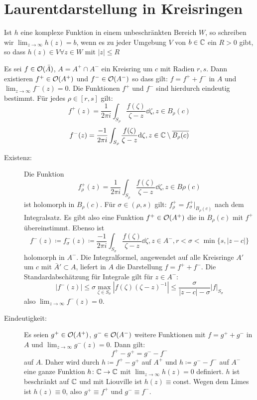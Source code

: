 \section{Laurentdarstellung in Kreisringen}
\begin{definition}
	Ist $ h $ eine komplexe Funktion in einem unbeschr\"ankten Bereich $ W $, so schreiben wir $ \lim_{z\to\infty}h(z)=b $, wenn es zu jeder Umgebung $ V $ von $ b\in\mathbb{C} $ ein $ R>0 $ gibt, so dass $ h(z)\in V\forall z\in W $ mit $ |z|\leq R $
\end{definition}
\begin{satz}
	Es sei $ f\in\mathcal O(\bar A) $, $ A=A^+\cap A^- $ ein Kreisring um $ c $ mit Radien $ r,s $. Dann existieren $ f^+\in\mathcal O(A^+) $ und $ f^-\in\mathcal O(A^-) $ so dass gilt: $ f=f^++f^- $ in $ A $ und $ \lim_{z\to\infty} f^-(z)=0 $. Die Funktionen $ f^+ $ und $ f^- $ sind hierdurch eindeutig bestimmt. F\"ur jedes $ \rho\in[r,s] $ gilt:
	\[ f^+(z)=\frac{1}{2\pi i}\int_{S_\rho}\frac{f(\zeta)}{\zeta-z}\dd\zeta,z\in B_\rho(c) \]
	\[ f^-(z)=\frac{-1}{2\pi i}\int_{S_\rho}\frac{f(\zeta)}{\zeta-z}\mathrm d\zeta,z\in\mathbb{C}\setminus\overline{B_\rho(c)} \]
\end{satz}
\begin{beweis}
	\begin{description}
		\item[Existenz:] Die Funktion \[ f^+_\rho(z)=\frac{1}{2\pi i}\int_{S_{\rho}}\frac{f(\zeta)}{\zeta-z}\dd\zeta, z\in B\rho(c) \] ist holomorph in $ B_\rho(c) $. F\"ur $ \sigma\in(\rho, s) $ gilt: $ f^+_{\rho}=f^+_\sigma|_{B_\rho(c)} $ nach dem Integralsatz. Es gibt also eine Funktion $ f^+\in\mathcal O(A^+) $ die in $ B_\rho(c) $	mit $ f^+ $ \"ubereinstimmt. Ebenso ist
		\[ f^-(z)\coloneqq f^-_\sigma(z)\coloneqq\frac{-1}{2\pi i}\int_{S_\sigma}\frac{f(\zeta)}{\zeta-z}\dd\zeta,z\in A^-, r<\sigma<\min\lbrace s,|z-c|\rbrace \]
		holomorph in $ A^- $. Die Integralformel, angewendet auf alle Kreisringe $ A' $ um $ c $ mit $ \bar A'\subset A $, liefert in $ A $ die Darstellung $ f=f^++f^- $. Die Standardabsch\"atzung f\"ur Integrale gilt f\"ur $ z\in A^- $:
		\[ |f^-(z)|\leq\sigma\max_{\zeta\in S_\sigma}|f(\zeta)(\zeta-z)^{-1}|\leq\frac{\sigma}{|z-c|-\sigma}|f|_{S_\sigma} \]
		also $ \lim_{z\to\infty}f^-(z)=0 $.
		\item[Eindeutigkeit:] Es seien $ g^+\in\mathcal O(A^+) $, $ g^-\in\mathcal O(A^-) $ weitere Funktionen mit $ f=g^++g^- $ in $ A $ und $ \lim_{z\to\infty} g^-(z)=0 $. Dann gilt:
		\[ f^+-g^+=g^--f^- \]
		auf $ A $. Daher wird durch $ h\coloneqq f^+-g^+ $ auf $ A^+ $ und $ h\coloneqq g^--f^- $ auf $ A^- $ eine ganze Funktion $ h\colon\mathbb{C}\rightarrow\mathbb{C} $ mit $ \lim_{z\to\infty}h(z)=0 $ definiert. $ h $ ist beschr\"ankt auf $ \mathbb{C} $ und mit Liouville ist $ h(z)\equiv $const. Wegen dem Limes ist $ h(z)\equiv 0 $, also $ g^+\equiv f^+ $ und $ g^-\equiv f^- $.
	\end{description}
\end{beweis}
